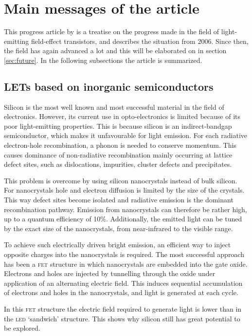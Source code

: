 \section{Main messages of the article}

This progress article by \citet{Muccini} is a treatise on the progress made in the field of light-emitting field-effect transistors, and describes the situation from 2006. Since then, the field has again advanced a lot and this will be elaborated on in section \ref{sec:future}. In the following subsections the article is summarized.

\subsection{LETs based on inorganic semiconductors} %

Silicon is the most well known and most successful material in the field of electronics. However, its current use in opto-electronics is limited because of its poor light-emitting properties. This is because silicon is an indirect-bandgap semiconductor, which makes it unfavourable for light emission. For each radiative electron-hole recombination, a phonon is needed to conserve momentum. This causes dominance of non-radiative recombination mainly occurring at lattice defect sites, such as dislocations, impurities, cluster defects and precipitates.

This problem is overcome by using silicon nanocrystals instead of bulk silicon. For nanocrystals hole and electron diffusion is limited by the size of the crystals. This way defect sites become isolated and radiative emission is the dominant recombination pathway. Emission from nanocrystals can therefore be rather high, up to a quantum efficiency of  10\%. Additionally, the emitted light can be tuned by the exact size of the nanocrystals, from near-infrared to the visible range. 

To achieve such electrically driven bright emission, an efficient way to inject opposite charges into the nanocrystals is required. The most successful approach has been a \textsc{fet} structure in which nanocrystals are embedded into the gate oxide. Electrons and holes are injected by tunnelling through the oxide under application of an alternating electric field. This induces sequential accumulation of electrons and holes in the nanocrystals, and light is generated at each cycle.

In this \textsc{fet} structure the electric field required to generate light is lower than in the \textsc{led} `sandwich' structure. This shows why silicon still has great potential to be explored.


